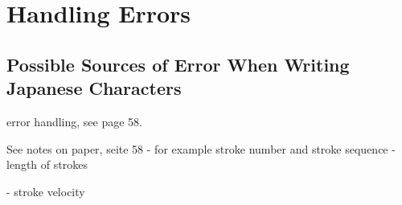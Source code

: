 \section{Handling Errors}
\label{sec:concept:handlingerrors}




\subsection[Sources of Error]{Possible Sources of Error When Writing Japanese Characters}
\label{sec:concept:sourcesoferror}

error handling, see page 58.


See notes on paper, seite 58
- for example stroke number and stroke sequence
- length of strokes

- stroke velocity